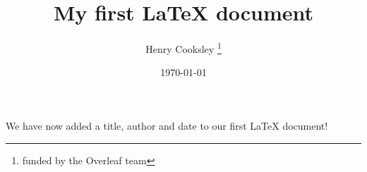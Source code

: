 \documentclass[12pt, a4paper]{article}
\title{My first \LaTeX{} document}
\author{Henry Cooksley \thanks{funded by the Overleaf team}}
\date{\today}
\begin{document}
\maketitle

We have now added a title, author and date to our first \LaTeX{} document!
\end{document}
